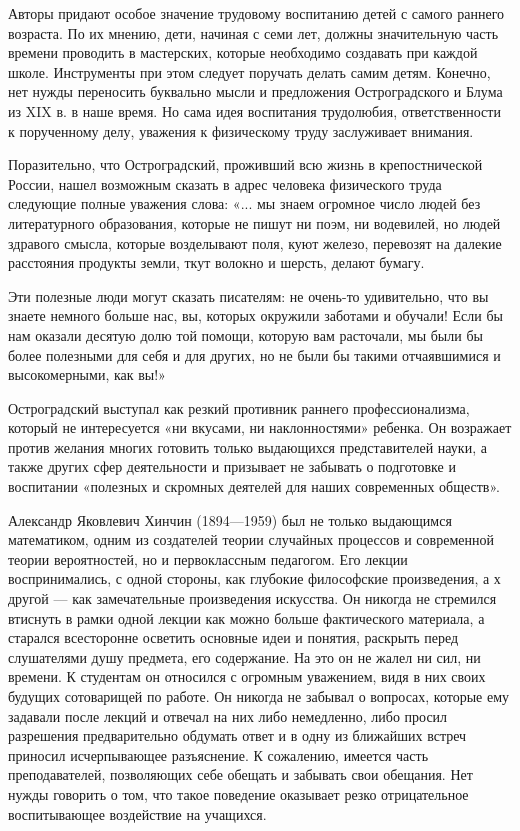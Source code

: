 \documentclass[12pt, a4paper, openany]{book}
\begin{document}
Авторы придают особое значение трудовому воспитанию детей с самого раннего возраста. По их мнению, дети,  начиная с семи лет, должны значительную часть времени  проводить в мастерских, которые необходимо создавать при каждой школе. Инструменты при этом следует поручать делать самим детям. Конечно, нет нужды переносить  буквально мысли и предложения Остроградского и Блума из XIX в. в наше время. Но сама идея воспитания  трудолюбия, ответственности к порученному делу, уважения к  физическому труду заслуживает внимания. 

Поразительно, что Остроградский, проживший всю жизнь в крепостнической России, нашел возможным сказать в адрес человека физического труда следующие полные  уважения слова: «... мы знаем огромное число людей без  литературного образования, которые не пишут ни поэм, ни  водевилей, но людей здравого смысла, которые возделывают поля, куют железо, перевозят на далекие расстояния  продукты земли, ткут волокно и шерсть, делают бумагу. 

Эти полезные люди могут сказать писателям: не очень-то удивительно, что вы знаете немного больше нас, вы, которых окружили заботами и обучали! Если бы нам  оказали десятую долю той помощи, которую вам расточали, мы были бы более полезными для себя и для других, но не были бы такими отчаявшимися и высокомерными, как вы!» 

Остроградский выступал как резкий противник раннего профессионализма, который не интересуется «ни вкусами, ни наклонностями» ребенка. Он возражает против желания многих готовить только выдающихся представителей науки, а также других сфер деятельности и призывает не  забывать о подготовке и воспитании «полезных и скромных  деятелей для наших современных обществ». 

Александр Яковлевич Хинчин (1894—1959) был не только выдающимся математиком, одним из создателей  теории случайных процессов и современной теории  вероятностей, но и первоклассным педагогом. Его лекции  воспринимались, с одной стороны, как глубокие философские  произведения, а х другой — как замечательные произведения искусства. Он никогда не стремился втиснуть в рамки одной лекции как можно больше фактического материала, а  старался всесторонне осветить основные идеи и понятия,  раскрыть перед слушателями душу предмета, его  содержание. На это он не жалел ни сил, ни времени. К студентам он относился с огромным уважением, видя в них своих будущих сотоварищей по работе. Он никогда не забывал о вопросах, которые ему задавали после лекций и отвечал на них либо немедленно, либо просил разрешения  предварительно обдумать ответ и в одну из ближайших встреч  приносил исчерпывающее разъяснение. К сожалению, имеется часть преподавателей, позволяющих себе обещать и  забывать свои обещания. Нет нужды говорить о том, что такое поведение оказывает резко отрицательное воспитывающее воздействие на учащихся. 
\end{document}
